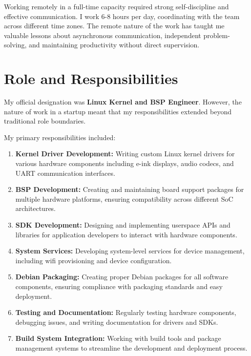 \documentclass[12pt,a4paper]{report}
\begin{document}
\vspace{0.3cm}

Working remotely in a full-time capacity required strong self-discipline and effective communication. I work 6-8 hours per day, coordinating with the team across different time zones. The remote nature of the work has taught me valuable lessons about asynchronous communication, independent problem-solving, and maintaining productivity without direct supervision.

\section{Role and Responsibilities}

My official designation was \textbf{Linux Kernel and BSP Engineer}. However, the nature of work in a startup meant that my responsibilities extended beyond traditional role boundaries.

\vspace{0.3cm}

My primary responsibilities included:

\begin{enumerate}[itemsep=0.3cm]
    \item \textbf{Kernel Driver Development:} Writing custom Linux kernel drivers for various hardware components including e-ink displays, audio codecs, and UART communication interfaces.

    \item \textbf{BSP Development:} Creating and maintaining board support packages for multiple hardware platforms, ensuring compatibility across different SoC architectures.

    \item \textbf{SDK Development:} Designing and implementing userspace APIs and libraries for application developers to interact with hardware components.

    \item \textbf{System Services:} Developing system-level services for device management, including wifi provisioning and device configuration.

    \item \textbf{Debian Packaging:} Creating proper Debian packages for all software components, ensuring compliance with packaging standards and easy deployment.

    \item \textbf{Testing and Documentation:} Regularly testing hardware components, debugging issues, and writing documentation for drivers and SDKs.

    \item \textbf{Build System Integration:} Working with build tools and package management systems to streamline the development and deployment process.
\end{enumerate}
\end{document}

